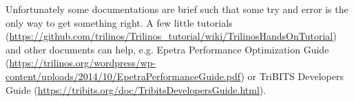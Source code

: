 \documentclass[10pt,a4paper,final,titlepage]{article}
\begin{document}
Unfortunately some documentations are brief such that some try and error is the only way to get something right. A few little tutorials (\url{https://github.com/trilinos/Trilinos_tutorial/wiki/TrilinosHandsOnTutorial}) and other documents can help, e.g. Epetra Performance Optimization Guide (\url{https://trilinos.org/wordpress/wp-content/uploads/2014/10/EpetraPerformanceGuide.pdf}) or TriBITS Developers Guide (\url{https://tribits.org/doc/TribitsDevelopersGuide.html}).
\end{document}
